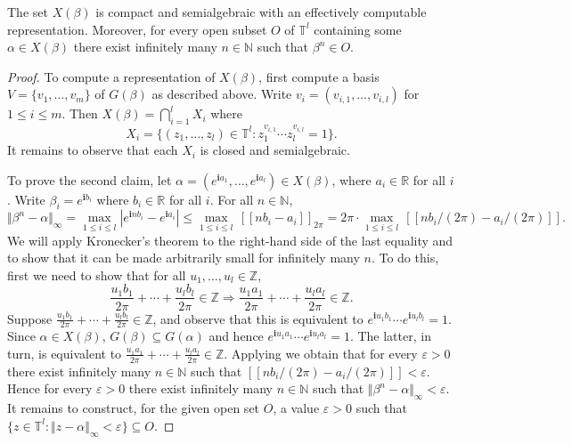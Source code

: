 \documentclass[a4paper,UKenglish,cleveref]{lipics-v2021}
\newcommand{\torus}{\mathbb{T}}
\newcommand{\nat}{\mathbb{N}}
\newcommand{\intg}{\mathbb{Z}}
\newcommand{\rel}{\mathbb{R}}
\newcommand{\im}{\bm{i}}
\begin{document}
\begin{lemma}
	\label{thm:kronecker-uniform-recurrence}
	The set $X(\beta)$ is compact and semialgebraic with an effectively computable representation.
	Moreover, for every open subset $O$ of $\torus^l$ containing some $\alpha \in X(\beta)$ there exist infinitely many $n \in \nat$ such that $\beta^n \in O$.
\end{lemma}
\begin{proof}
	To compute a representation of $X(\beta)$, first compute a basis $V = \{v_1,\ldots,v_m\}$ of $G(\beta)$ as described above.
	Write $v_i = (v_{i,1},\ldots,v_{i,l})$ for $1 \le i \le m$.
	Then $X(\beta) = \bigcap_{i=1}^l X_i$ where 
	\[
	X_i = 
	\{
	(z_1,\ldots,z_l) \in \torus^l \colon z_1^{v_{i,1}} \cdots z_l^{v_{i,l}} = 1
	\}.
	\]
	It remains to observe that each $X_i$ is closed and semialgebraic.
	
	To prove the second claim, let $\alpha = (e^{\bm{i} a_1},\ldots,e^{\bm{i} a_l}) \in X(\beta)$, where $a_i\in \rel$ for all $i$.
	Write $\beta_i = e^{\im b_i}$ where $b_i \in \rel$ for all $i$.
	For all $n\in \nat$,
	\[
	\Vert \beta^n - \alpha \Vert_\infty = \max_{1 \le i \le l} |e^{\bm{i} n b_i} - e^{\bm{i} a_i}| 
	\le 
	\max_{1 \le i \le l}\, [\![ nb_i - a_i ]\!]_{2\pi} 
	= 2\pi 	\cdot \max_{1 \le i \le l}\,  [\![ nb_i/(2\pi) - a_i/(2\pi)]\!].
	\]
	We will apply Kronecker's theorem to the right-hand side of the last equality and to show that it can be made arbitrarily small for infinitely many $n$.
	To do this, first we need to show that  for all $u_1,\ldots, u_l \in \intg$, 
	\[
	\frac{u_1b_1}{2\pi} + \cdots + \frac{u_lb_l}{2\pi} \in \intg \Rightarrow \frac{u_1a_1}{2\pi} + \cdots + \frac{u_la_l}{2\pi} \in \intg.
	\] 
	Suppose $\frac{u_1b_1}{2\pi} + \cdots + \frac{u_lb_l}{2\pi} \in \intg$, and observe that this is equivalent to $e^{\bm{i} u_1 b_1} \cdots e^{\bm{i} u_l b_l} = 1$.
	Since $\alpha \in X(\beta)$, $G(\beta) \subseteq G(\alpha)$ and hence $e^{\bm{i} u_1 a_1} \cdots e^{\bm{i}  u_l a_l} = 1$.
	The latter, in turn, is equivalent to $\frac{u_1a_1}{2\pi} + \cdots + \frac{u_la_l}{2\pi} \in \intg$.
	Applying  we obtain that for every $\varepsilon > 0$ there exist infinitely many $n \in \nat$ such that $[\![ nb_i/(2\pi) - a_i/(2\pi)]\!] < \varepsilon$.
	Hence for every $\varepsilon > 0$ there exist infinitely many $n \in \nat$ such that $\Vert \beta^n - \alpha \Vert_\infty < \varepsilon$.
	It remains to construct, for the given open set $O$, a value $\varepsilon > 0$ such that $\{z \in \torus^l \colon \Vert z - \alpha \Vert_\infty < \varepsilon\} \subseteq O$.
\end{proof}
\end{document}
